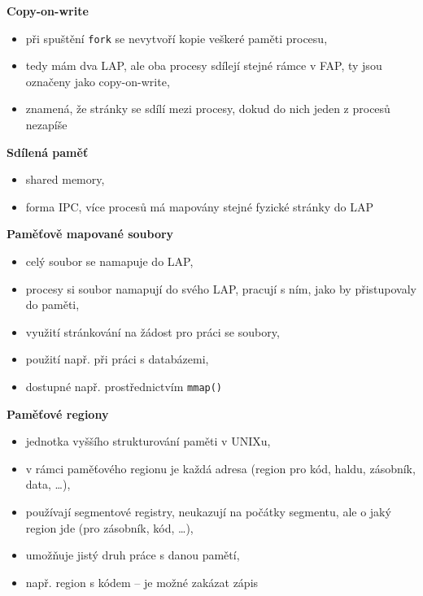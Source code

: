 \documentclass[a4paper, 11pt]{article}
\newcommand{\tcmd}[1]{\texttt{#1}}
\begin{document}
\textbf{Copy-on-write}
\begin{itemize}
    \item při spuštění \tcmd{fork} se nevytvoří kopie veškeré paměti procesu,
    \item tedy mám dva LAP, ale oba procesy sdílejí stejné rámce v FAP, ty jsou označeny jako copy-on-write,
    \item znamená, že stránky se sdílí mezi procesy, dokud do nich jeden z procesů nezapíše
\end{itemize}

\textbf{Sdílená paměť}
\begin{itemize}
    \item shared memory,
    \item forma IPC, více procesů má mapovány stejné fyzické stránky do LAP
\end{itemize}

\textbf{Paměťově mapované soubory}
\begin{itemize}
    \item celý soubor se namapuje do LAP,
    \item procesy si soubor namapují do svého LAP, pracují s ním, jako by přistupovaly do paměti,
    \item využití stránkování na žádost pro práci se soubory,
    \item použití např. při práci s databázemi,
    \item dostupné např. prostřednictvím \tcmd{mmap()}
\end{itemize}
 
\textbf{Paměťové regiony}
\begin{itemize}
    \item jednotka vyššího strukturování paměti v UNIXu,
    \item v rámci paměťového regionu je každá adresa (region pro kód, haldu, zásobník, data, \ldots),
    \item používají segmentové registry, neukazují na počátky segmentu, ale o jaký region jde (pro zásobník, kód, \ldots),
    \item umožňuje jistý druh práce s danou pamětí,
    \item např. region s kódem -- je možné zakázat zápis
\end{itemize}
 
\end{document}

